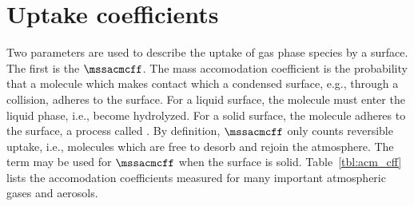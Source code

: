 \documentclass[12pt,twoside]{book}
\begin{document}
\section[Uptake coefficients]{Uptake coefficients}\label{sxn:upt}
Two parameters are used to describe the uptake of gas phase species by
a surface.
The first is the  $\mssacmcff$.
The mass accomodation coefficient is the probability that a molecule
which makes contact which a condensed surface, e.g., through a
collision, adheres to the surface. 
For a liquid surface, the molecule must enter the liquid phase, i.e.,
become hydrolyzed.
For a solid surface, the molecule adheres to the surface, a process
called .
By definition, $\mssacmcff$ only counts reversible uptake, i.e., 
molecules which are free to desorb and rejoin the atmosphere. 
The term  may be used for $\mssacmcff$
when the surface is solid.
Table~\ref{tbl:acm_cff} lists the accomodation coefficients measured
for many important atmospheric gases and aerosols.
\end{document}

